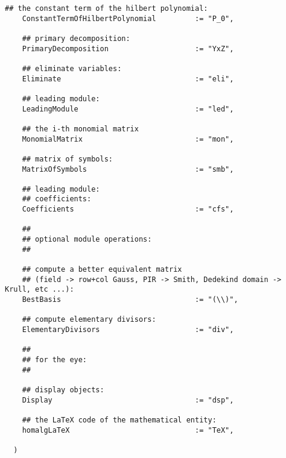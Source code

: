 \documentclass[a4paper,11pt]{report}
\begin{document}
{{{\begin{Verbatim}[fontsize=\small,frame=single,label=Code]
    ## the constant term of the hilbert polynomial:
    ConstantTermOfHilbertPolynomial         := "P_0",
    
    ## primary decomposition:
    PrimaryDecomposition                    := "YxZ",
    
    ## eliminate variables:
    Eliminate                               := "eli",
    
    ## leading module:
    LeadingModule                           := "led",
    
    ## the i-th monomial matrix
    MonomialMatrix                          := "mon",
    
    ## matrix of symbols:
    MatrixOfSymbols                         := "smb",
    
    ## leading module:
    ## coefficients:
    Coefficients                            := "cfs",
    
    ##
    ## optional module operations:
    ##
    
    ## compute a better equivalent matrix
    ## (field -> row+col Gauss, PIR -> Smith, Dedekind domain -> Krull, etc ...):
    BestBasis                               := "(\\)",
    
    ## compute elementary divisors:
    ElementaryDivisors                      := "div",
    
    ##
    ## for the eye:
    ##
    
    ## display objects:
    Display                                 := "dsp",
    
    ## the LaTeX code of the mathematical entity:
    homalgLaTeX                             := "TeX",
    
  )
\end{Verbatim}
 }

 }

  }

   
\end{document}
